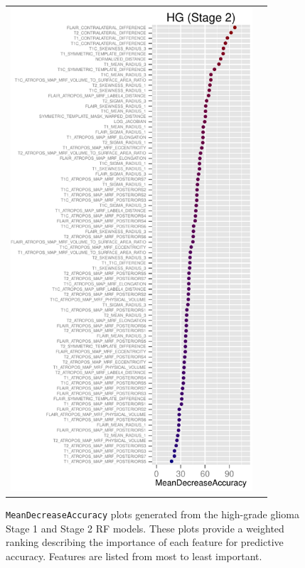 \documentclass[preprint,authoryear,review,12pt]{elsarticle}
\begin{document}
{\begin{figure}
{\begin{tabular}{cc}
  \includegraphics[width=90mm]{Figures/BRATS_HG_MAP_MRF.pdf} \\
  \end{tabular}
  }
  \caption{{\tt MeanDecreaseAccuracy} plots generated from the high-grade glioma
  Stage 1 and Stage 2 RF models.  These plots provide a weighted 
  ranking describing the importance of each feature for predictive accuracy. 
  Features are listed from most to least important.
  }
  \label{fig:hgimportance}
\end{figure}

}
\end{document}
